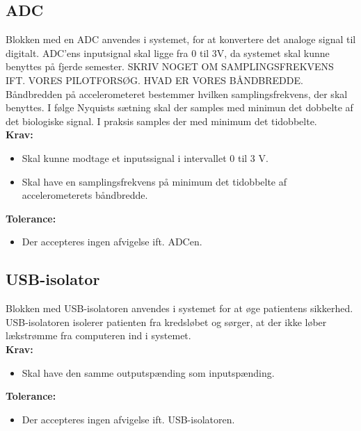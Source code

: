 \subsection{ADC}
Blokken med en ADC anvendes i systemet, for at konvertere det analoge signal til digitalt. %
ADC'ens inputsignal skal ligge fra 0 til 3V, da systemet skal kunne benyttes på fjerde semester. %
SKRIV NOGET OM SAMPLINGSFREKVENS IFT. VORES PILOTFORSØG. HVAD ER VORES BÅNDBREDDE. Båndbredden på accelerometeret bestemmer hvilken samplingsfrekvens, der skal benyttes. I følge Nyquists sætning skal der samples med minimun det dobbelte af det biologiske signal. I praksis samples der med minimum det tidobbelte. \\
\textbf{Krav:}
\begin{itemize}
\item Skal kunne modtage et inputssignal i intervallet 0 til 3 V.
\item Skal have en samplingsfrekvens på minimum det tidobbelte af accelerometerets båndbredde.
\end{itemize}
\textbf{Tolerance:}
\begin{itemize}
\item Der accepteres ingen afvigelse ift. ADCen.
\end{itemize}
\subsection{USB-isolator}
Blokken med USB-isolatoren anvendes i systemet for at øge patientens sikkerhed. USB-isolatoren isolerer patienten fra kredsløbet og sørger, at der ikke løber lækstrømme fra computeren ind i systemet.\\
\textbf{Krav:}
\begin{itemize}
\item Skal have den samme outputspænding som inputspænding. 
\end{itemize}
\textbf{Tolerance:}
\begin{itemize}
\item Der accepteres ingen afvigelse ift. USB-isolatoren. 
\end{itemize}
